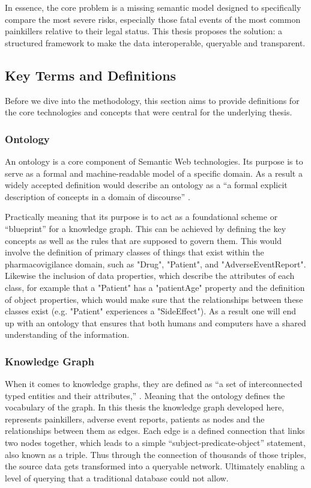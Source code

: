 In essence, the core problem is a missing semantic model designed to specifically compare the most severe risks, especially those fatal events of the most common painkillers relative to their legal status. This thesis proposes the solution: a structured framework to make the data interoperable, queryable and transparent.
\subsection{Key Terms and Definitions}
Before we dive into the methodology, this section aims to provide definitions for the core technologies and concepts that were central for the underlying thesis. 
\subsubsection{Ontology}
An ontology is a core component of Semantic Web technologies. Its purpose is to serve as a formal and machine-readable model of a specific domain. As a result a widely accepted definition would describe an ontology as a “a formal explicit description of concepts in a domain of discourse” \cite{Noy2001}.

Practically meaning that its purpose is to act as a foundational scheme or “blueprint” for a knowledge graph. This can be achieved by defining the key concepts as well as the rules that are supposed to govern them. This would involve the definition of primary classes of things that exist within the pharmacovigilance domain, such as "Drug", "Patient", and "AdverseEventReport". Likewise the inclusion of data properties, which describe the attributes of each class, for example that a "Patient" has a "patientAge" property and the definition of object properties, which would make sure that the relationships between these classes exist (e.g. "Patient" experiences a "SideEffect"). As a result one will end up with an ontology that ensures that both humans and computers have a shared understanding of the information.
\subsubsection{Knowledge Graph}
When it comes to knowledge graphs, they are defined as “a set of interconnected typed entities and their attributes,” \cite{Pan2017exploiting}. Meaning that the ontology defines the vocabulary of the graph. In this thesis the knowledge graph developed here, represents painkillers, adverse event reports, patients as nodes and the relationships between them as edges. Each edge is a defined connection that links two nodes together, which leads to a simple “subject-predicate-object” statement, also known as a triple. Thus through the connection of thousands of those triples, the source data gets transformed into a queryable network. Ultimately enabling a level of querying that a traditional database could not allow. 
